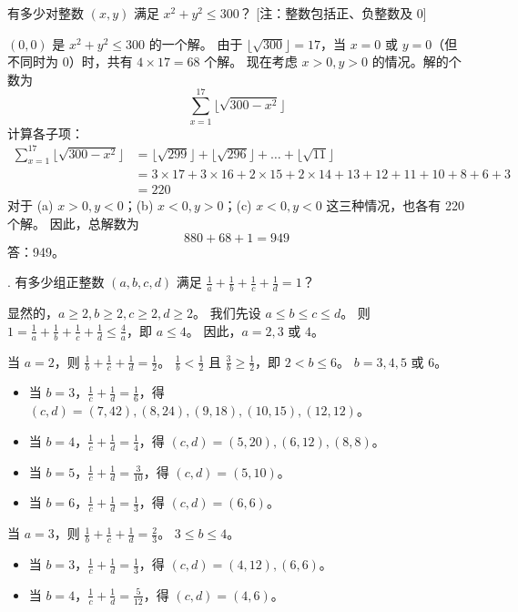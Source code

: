 \begin{questions}
\question 有多少对整数 $(x, y)$ 满足 $x^2 + y^2 \le 300$？
[注：整数包括正、负整数及 0]

\begin{solution}
$(0, 0)$ 是 $x^2 + y^2 \le 300$ 的一个解。
由于 $\lfloor \sqrt{300} \rfloor = 17$，当 $x = 0$ 或 $y = 0$（但不同时为 0）时，共有 $4 \times 17 = 68$ 个解。
现在考虑 $x > 0, y > 0$ 的情况。解的个数为
\[
\sum_{x=1}^{17} \lfloor \sqrt{300 - x^2} \rfloor
\]
计算各子项：
\begin{align}
\sum_{x=1}^{17} \lfloor \sqrt{300 - x^2} \rfloor &= \lfloor \sqrt{299} \rfloor + \lfloor \sqrt{296} \rfloor + \dots + \lfloor \sqrt{11} \rfloor \\
&= 3 \times 17 + 3 \times 16 + 2 \times 15 + 2 \times 14 + 13 + 12 + 11 + 10 + 8 + 6 + 3 \\
&= 220
\end{align}
对于 (a) $x > 0, y < 0$；(b) $x < 0, y > 0$；(c) $x < 0, y < 0$ 这三种情况，也各有 220 个解。
因此，总解数为
\[
880 + 68 + 1 = 949
\]
答：949。
\end{solution}

. 有多少组正整数 $(a, b, c, d)$ 满足 $\frac{1}{a} + \frac{1}{b} + \frac{1}{c} + \frac{1}{d} = 1$？

\begin{solution}
显然的，$a \ge 2, b \ge 2, c \ge 2, d \ge 2$。
我们先设 $a \le b \le c \le d$。
则 $1 = \frac{1}{a} + \frac{1}{b} + \frac{1}{c} + \frac{1}{d} \le \frac{4}{a}$，即 $a \le 4$。
因此，$a = 2, 3$ 或 $4$。

当 $a=2$，则 $\frac{1}{b} + \frac{1}{c} + \frac{1}{d} = \frac{1}{2}$。
$\frac{1}{b} < \frac{1}{2}$ 且 $\frac{3}{b} \ge \frac{1}{2}$，即 $2 < b \le 6$。
$b = 3, 4, 5$ 或 $6$。
\begin{itemize}
    \item 当 $b=3$，$\frac{1}{c} + \frac{1}{d} = \frac{1}{6}$，得 $(c, d) = (7, 42), (8, 24), (9, 18), (10, 15), (12, 12)$。
    \item 当 $b=4$，$\frac{1}{c} + \frac{1}{d} = \frac{1}{4}$，得 $(c, d) = (5, 20), (6, 12), (8, 8)$。
    \item 当 $b=5$，$\frac{1}{c} + \frac{1}{d} = \frac{3}{10}$，得 $(c, d) = (5, 10)$。
    \item 当 $b=6$，$\frac{1}{c} + \frac{1}{d} = \frac{1}{3}$，得 $(c, d) = (6, 6)$。
\end{itemize}

当 $a=3$，则 $\frac{1}{b} + \frac{1}{c} + \frac{1}{d} = \frac{2}{3}$。
$3 \le b \le 4$。
\begin{itemize}
    \item 当 $b=3$，$\frac{1}{c} + \frac{1}{d} = \frac{1}{3}$，得 $(c, d) = (4, 12), (6, 6)$。
    \item 当 $b=4$，$\frac{1}{c} + \frac{1}{d} = \frac{5}{12}$，得 $(c, d) = (4, 6)$。
\end{itemize}


\end{solution}
\end{questions}
